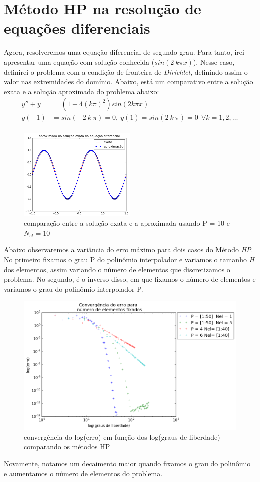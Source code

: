 \section{Método HP na resolução de equações diferenciais}

 Agora, resolveremos uma equação diferencial de segundo grau. Para tanto, irei apresentar uma equação com solução conhecida ($sin(2\ k \pi x)$). Nesse caso, definirei o problema com a condição de fronteira de \emph{Dirichlet}, definindo assim o valor nas extremidades do domínio. Abaixo, está um comparativo entre a solução exata e a solução aproximada do problema abaixo:
\begin{align}
y'' + y &= (1 + 4 (k \pi)^2)sin(2 k \pi x) \\
y(-1) &= sin(-2\ k \ \pi ) = 0 ,\ y(1) = sin(2\ k\ \pi) = 0 \ \ \forall k = 1,2,\dots \\
\end{align}	
\begin{figure}[H]
\centering
\includegraphics[width=0.5\textwidth,center]{figuras/solu_edo_simul.png}
\caption{comparação entre a solução exata e a aproximada usando P = 10 e $N_{el} = 10$ } 
\end{figure}
 Abaixo observaremos a variância do erro máximo para dois casos do Método \emph{HP}. No primeiro fixamos o grau P do polinômio interpolador e variamos o tamanho \emph{H} dos elementos, assim variando o número de elementos que discretizamos o problema. No segundo, é o inverso disso, em que fixamos o número de elementos e variamos o grau do polinômio interpolador P.
\begin{figure}[H]
  \includegraphics[width=.7 \textwidth,center]{figuras/convergencia_erro_HP.png}
  \caption{convergência do log(erro) em função dos log(graus de liberdade) comparando os métodos HP }
\end{figure}
 Novamente, notamos um decaimento maior quando fixamos o grau do polinômio e aumentamos o número de elementos do problema.
